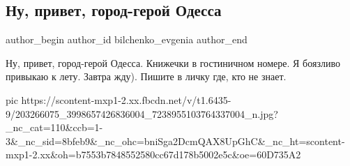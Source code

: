  
 
 
 
 
 
\subsection{Ну, привет, город-герой Одесса}
\label{sec:21_06_2021.fb.bilchenko_evgenia.2.privet_odessa}
\ifcmt
 author_begin
   author_id bilchenko_evgenia
 author_end
\fi

Ну, привет, город-герой Одесса. Книжечки в гостиничном номере. Я боязливо
привыкаю к лету. Завтра жду). Пишите в личку где, кто не знает.

\ifcmt
  pic https://scontent-mxp1-2.xx.fbcdn.net/v/t1.6435-9/203266075_3998657426836004_7238955103764337004_n.jpg?_nc_cat=110&ccb=1-3&_nc_sid=8bfeb9&_nc_ohc=bniSga2DcmQAX8UpGhC&_nc_ht=scontent-mxp1-2.xx&oh=b7553b7848552580cc67d178b5002e5c&oe=60D735A2
\fi
